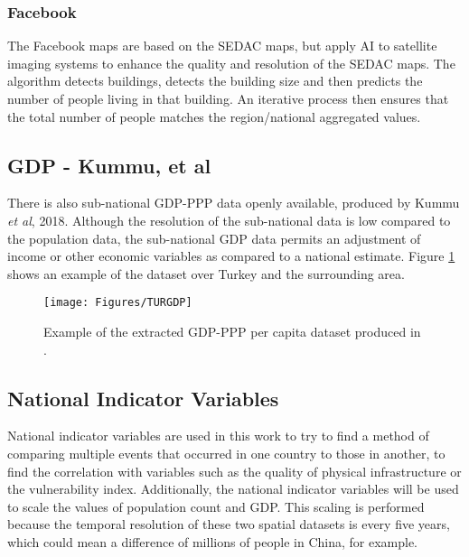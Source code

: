 \documentclass[10pt,a4paper]{article}
\begin{document}
\begin{multicols}{1}
\subsubsection{Facebook}\label{sec:facebookpop}
The Facebook maps are based on the SEDAC maps, but apply AI to satellite imaging systems to enhance the quality and resolution of the SEDAC maps. The algorithm detects buildings, detects the building size and then predicts the number of people living in that building. An iterative process then ensures that the total number of people matches the region/national aggregated values.
\subsection{GDP - Kummu, et al}\label{sec:GDP}
There is also sub-national GDP-PPP data openly available, produced by Kummu {\it et al}, 2018. Although the resolution of the sub-national data is low compared to the population data, the sub-national GDP data permits an adjustment of income or other economic variables as compared to a national estimate. Figure \ref{fig:GDP} shows an example of the dataset over Turkey and the surrounding area.
\begin{figure}[H]
   \texttt{[image: Figures/TURGDP]}
 	\caption{Example of the extracted GDP-PPP per capita dataset produced in \cite{Kummu}.}
 	\label{fig:GDP}
\end{figure}
\subsection{National Indicator Variables}\label{sec:nationalind}
National indicator variables are used in this work to try to find a method of comparing multiple events that occurred in one country to those in another, to find the correlation with variables such as the quality of physical infrastructure or the vulnerability index. Additionally, the national indicator variables will be used to scale the values of population count and GDP. This scaling is performed because the temporal resolution of these two spatial datasets is every five years, which could mean a difference of millions of people in China, for example.

\end{multicols}
\end{document}
